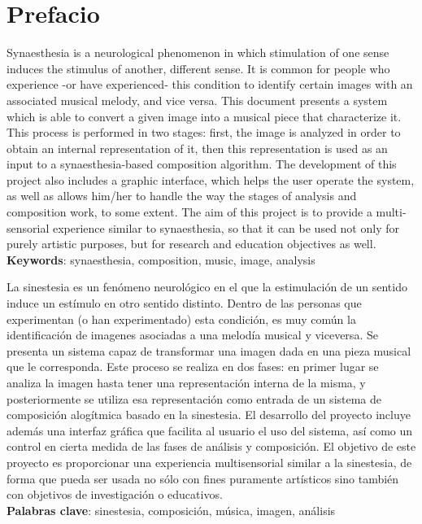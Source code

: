 \chapter*{Prefacio}

\small

Synaesthesia is a neurological phenomenon in which stimulation of one sense induces the stimulus of another, different sense. It is common for people who experience -or have experienced- this condition to identify certain images with an associated musical melody, and vice versa. This document presents a system which is able to convert a given image into a musical piece that characterize it. This process is performed in two stages: first, the image is analyzed in order to obtain an internal representation of it, then this representation is used as an input to a synaesthesia-based composition algorithm. The development of this project also includes a graphic interface, which helps the user operate the system, as well as allows him/her to handle the way the stages of analysis and composition work, to some extent. The aim of this project is to provide a multi-sensorial experience similar to synaesthesia, so that it can be used not only for purely artistic purposes, but for research and education objectives as well.\\

\noindent\textbf{Keywords}: synaesthesia, composition, music, image, analysis\\

\vspace{0.3in}



La sinestesia es un fenómeno neurológico en el que la estimulación de un sentido induce un estímulo en otro sentido distinto. Dentro de las personas que experimentan (o han experimentado) esta condición, es muy común la identificación de imagenes asociadas a una melodía musical y viceversa. Se presenta un sistema capaz de transformar una imagen dada en una pieza musical que le corresponda. Este proceso se realiza en dos fases: en primer lugar se analiza la imagen hasta tener una representación interna de la misma, y posteriormente se utiliza esa representación como entrada de un sistema de composición alogítmica basado en la sinestesia. El desarrollo del proyecto incluye además una interfaz gráfica que facilita al usuario el uso del sistema, así como un control en cierta medida de las fases de análisis y composición. El objetivo de este proyecto es proporcionar una experiencia multisensorial similar a la sinestesia, de forma que pueda ser usada no sólo con fines puramente artísticos sino también con objetivos de investigación o educativos.\\


\noindent\textbf{Palabras clave}: sinestesia, composición, música, imagen, análisis\\


\normalsize